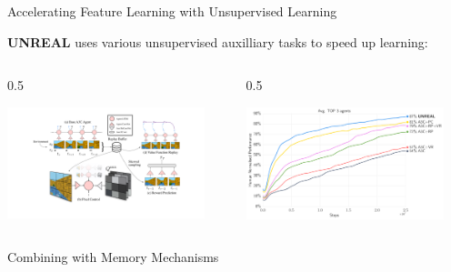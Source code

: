 \documentclass[9pt]{beamer}
\newcommand{\twocolumns}[4]{
\begin{columns}
\begin{column}{#1\textwidth}
    #3
\end{column}
\begin{column}{#2\textwidth}
	#4
\end{column}
\end{columns}
}
\begin{document}
\begin{frame}{Accelerating Feature Learning with Unsupervised Learning}

\textbf{UNREAL} uses various unsupervised auxilliary tasks to speed up learning:

\twocolumns{0.5}{0.5}{
\begin{center}
\includegraphics[width=0.9\textwidth]{p2-unreal2}
\end{center}
}{
\begin{center}
\includegraphics[width=0.9\textwidth]{p2-unreal-labyrinth}
\end{center}
}
\vspace{1em}



%

\end{frame}

\begin{frame}{Combining with Memory Mechanisms}

\end{frame}
\end{document}
